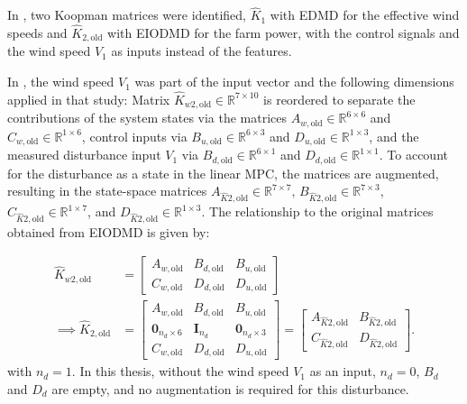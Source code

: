 In \cite{dittmer2023koopman}, two Koopman matrices were identified, $\hat{K}_1$ with EDMD for the effective wind speeds and $\hat{K}_{2,\text{old}}$ with EIODMD for the farm power, with the control signals and the wind speed $V_1$ as inputs instead of the features.

In \cite{dittmer2023koopman}, the wind speed $V_1$ was part of the input vector and the following dimensions applied in that study: Matrix $\hat{K}_{w2,\text{old}} \in \mathbb{R}^{7\times10}$ is reordered to separate the contributions of the system states via the matrices $A_{w,\text{old}} \in \mathbb{R}^{6\times6}$ and $C_{w,\text{old}} \in \mathbb{R}^{1\times6}$, control inputs via $B_{u,\text{old}} \in \mathbb{R}^{6\times3}$ and $D_{u,\text{old}} \in \mathbb{R}^{1\times3}$, and the measured disturbance input $V_1$ via $B_{d,\text{old}} \in \mathbb{R}^{6\times1}$ and $D_{d,\text{old}} \in \mathbb{R}^{1\times1}$. To account for the disturbance as a state in the linear MPC, the matrices are augmented, resulting in the state-space matrices $A_{\hat{K}2,\text{old}} \in \mathbb{R}^{7\times7}$, $B_{\hat{K}2,\text{old}} \in \mathbb{R}^{7\times3}$, $C_{\hat{K}2,\text{old}} \in \mathbb{R}^{1\times7}$, and $D_{\hat{K}2,\text{old}} \in \mathbb{R}^{1\times3}$. The relationship to the original matrices obtained from EIODMD is given by:

\begin{align*}
    \hat{K}_{w2,\text{old}} &= \left[\begin{array}{c|cc}
        A_{w,\text{old}} & B_{d,\text{old}} & B_{u,\text{old}}\\
        \hline
        C_{w,\text{old}} & D_{d,\text{old}} & D_{u,\text{old}}
    \end{array}\right]  \\
    \implies \hat{K}_{2,\text{old}} &= \left[\begin{array}{cc|c}
        A_{w,\text{old}} & B_{d,\text{old}} & B_{u,\text{old}}\\
        \bm{0}_{n_d\times6} & \bm{I}_{n_d} & \bm{0}_{n_d\times3}\\
        \hline
        C_{w,\text{old}} & D_{d,\text{old}} & D_{u,\text{old}}
    \end{array}\right] = \left[\begin{array}{c|c}
        A_{\hat{K}2,\text{old}} & B_{\hat{K}2,\text{old}}\\
        \hline
        C_{\hat{K}2,\text{old}} & D_{\hat{K}2,\text{old}}
    \end{array}\right].
\end{align*}
% 
with $n_d = 1$. In this thesis, without the wind speed $V_1$ as an input, $n_d = 0$, $B_d$ and $D_d$ are empty, and no augmentation is required for this disturbance. 